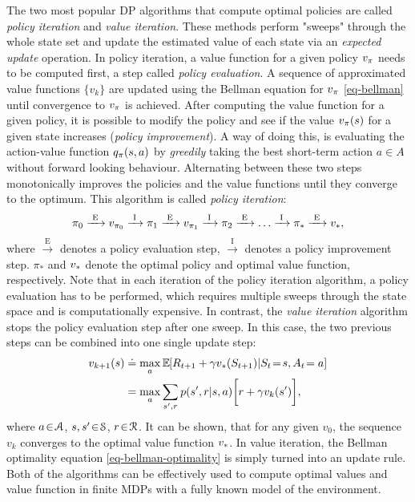 \documentclass[a4paper, 12pt]{article}
\begin{document}
The two most popular DP algorithms that compute optimal policies are called
\emph{policy iteration} and \emph{value iteration}. These methods perform "sweeps" through
the whole state set and update the estimated value of each state via an
\emph{expected update} operation. In policy iteration, a value function for a given
policy \(\vpi\) needs to be computed first, a step called \emph{policy evaluation}. A
sequence of approximated value functions \(\{v_k\}\) are updated using the Bellman
equation for \(\vpi\) \eqref{eq-bellman} until convergence to \(\vpi\) is achieved.
After computing the value function for a given policy, it is possible to modify
the policy and see if the value \(\vpi(s)\) for a given state increases (\emph{policy
improvement}). A way of doing this, is evaluating the action-value function
\(\qpi(s,a)\) by \emph{greedily} taking the best short-term action \(a\!\in\!A\) without
forward looking behaviour. Alternating between these two steps monotonically
improves the policies and the value functions until they converge to the
optimum. This algorithm is called \emph{policy iteration}:
\begin{equation}
    \pi_0 \xrightarrow{\text{ E }} v_{\pi_0} \xrightarrow{\text{ I }}
    \pi_1 \xrightarrow{\text{ E }} v_{\pi_1} \xrightarrow{\text{ I }}
    \pi_2 \xrightarrow{\text{ E }} \hdots \xrightarrow{\text{ I }}
    \pi_* \xrightarrow{\text{ E }} \vstar,
\end{equation}
where \(\xrightarrow{\text{ E }}\) denotes a policy evaluation step,
\(\xrightarrow{\text{ I }}\) denotes a policy improvement step. \(\pi_*\) and
\(\vstar\) denote the optimal policy and optimal value function, respectively.
Note that in each iteration of the policy iteration algorithm, a policy
evaluation has to be performed, which requires multiple sweeps through the state
space and is computationally expensive. In contrast, the \emph{value iteration}
algorithm stops the policy evaluation step after one sweep. In this case, the
two previous steps can be combined into one single update step:
\begin{equation}
\begin{split}
    v_{k+1}(s) &\defeq \max_a \EE{}{R_{t+1}+\gamma \vstar(S_{t+1})|S_t\!=\!s, A_t\!=a} \\
    &= \max_{a}\sum_{s',r}{p(s',r|s,a)}\bigg[r+\gamma v_k(s')\bigg],
\end{split}
\end{equation}
where \(a\!\in\!\A\), \(s,s'\!\in\!\S\), \(r\!\in\!\R\). It can be shown, that for any
given \(v_0\), the sequence \({v_k}\) converges to the optimal value function
\({\vstar}\). In value iteration, the Bellman optimality equation
\eqref{eq-bellman-optimality} is simply turned into an update rule. Both of the
algorithms can be effectively used to compute optimal values and value function
in finite MDPs with a fully known model of the environment.
\end{document}
